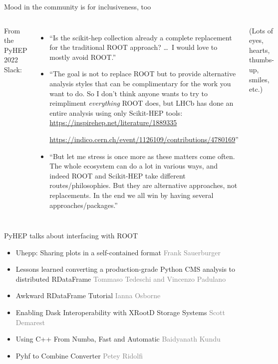 \documentclass[aspectratio=169]{beamer}
\begin{document}
\begin{frame}{Mood in the community is for inclusiveness, too}
\vspace{0.5 cm}
\begin{columns}
From the PyHEP 2022 Slack:

\vspace{0.15 cm}
\begin{itemize}\setlength{\itemsep}{0.25 cm}
\item ``Is the scikit-hep collection already a complete replacement for the traditional ROOT approach? \ldots\ I would love to mostly avoid ROOT.''

\item ``The goal is not to replace ROOT but to provide alternative analysis styles that can be complimentary for the work you want to do. So I don't think anyone wants to try to reimpliment {\it everything} ROOT does, but LHCb has done an entire analysis using only Scikit-HEP tools: \textcolor{blue}{\url{https://inspirehep.net/literature/1889335}}

\textcolor{blue}{\url{https://indico.cern.ch/event/1126109/contributions/4780169}}''

\item ``But let me stress is once more as these matters come often. The whole ecosystem can do a lot in various ways, and indeed ROOT and Scikit-HEP take different routes/philosophies. But they are alternative approaches, not replacements. In the end we all win by having several approaches/packages.''
\end{itemize}

\vspace{0.25 cm}
(Lots of eyes, hearts, thumbs-up, smiles, etc.)
\end{columns}
\end{frame}

\begin{frame}{PyHEP talks about interfacing with ROOT}
\begin{itemize}\setlength{\itemsep}{0.35 cm}
\item Uhepp: Sharing plots in a self-contained format \hfill \textcolor{gray}{Frank Sauerburger}
\item Lessons learned converting a production-grade Python CMS analysis to distributed RDataFrame \hfill \textcolor{gray}{Tommaso Tedeschi and Vincenzo Padulano}
\item Awkward RDataFrame Tutorial \hfill \textcolor{gray}{Ianna Osborne}
\item Enabling Dask Interoperability with XRootD Storage Systems \hfill \textcolor{gray}{Scott Demarest}
\item Using C++ From Numba, Fast and Automatic \hfill \textcolor{gray}{Baidyanath Kundu}
\item Pyhf to Combine Converter \hfill \textcolor{gray}{Petey Ridolfi}
\end{itemize}
\end{frame}
\end{document}
